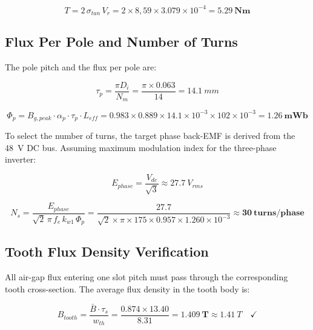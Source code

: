 \documentclass[12pt, a4paper]{article}
\begin{document}
\begin{equation}
    T = 2\,\sigma_{tan}\,V_r
      = 2 \times 8{,}59 \times 3.079\times10^{-4}
      = \mathbf{\SI{5.29}{Nm}}
\end{equation}

\subsection{Flux Per Pole and Number of Turns}

The pole pitch and the flux per pole are:

\begin{equation}
    \tau_p = \frac{\pi D_i}{N_m}
           = \frac{\pi \times 0.063}{14}
           = \SI{14.1}{mm}
\end{equation}

\begin{equation}
    \Phi_p = B_{g,peak}\cdot\alpha_p\cdot\tau_p\cdot L_{eff}
           = 0.983 \times 0.889 \times 14.1\times10^{-3} \times 102\times10^{-3}
           = \mathbf{\SI{1.26}{mWb}}
\end{equation}

To select the number of turns, the target phase back-EMF is derived from
the \SI{48}{V} DC bus. Assuming maximum modulation index for the
three-phase inverter:

\begin{equation}
    E_{phase} = \frac{V_{dc}}{\sqrt{3}}
              \approx \SI{27.7}{V_{rms}}
\end{equation}


\begin{equation}
    N_s = \frac{E_{phase}}{\sqrt{2}\,\pi\,f_e\,k_{w1}\,\Phi_p}
        = \frac{27.7}{\sqrt{2}\times\pi\times175\times0.957\times1.260\times10^{-3}}
        \approx \mathbf{30\ \text{turns/phase}}
\end{equation}

\subsection{Tooth Flux Density Verification}

All air-gap flux entering one slot pitch must pass through the
corresponding tooth cross-section. The average flux density in the tooth body is:

\begin{equation}
    B_{tooth} = \frac{\bar{B} \cdot \tau_s}{w_{th}}
              = \frac{0.874 \times 13.40}{8.31}
              = \mathbf{\SI{1.409}{T}} \approx \SI{1.41}{T} \quad \checkmark
\end{equation}
\end{document}

